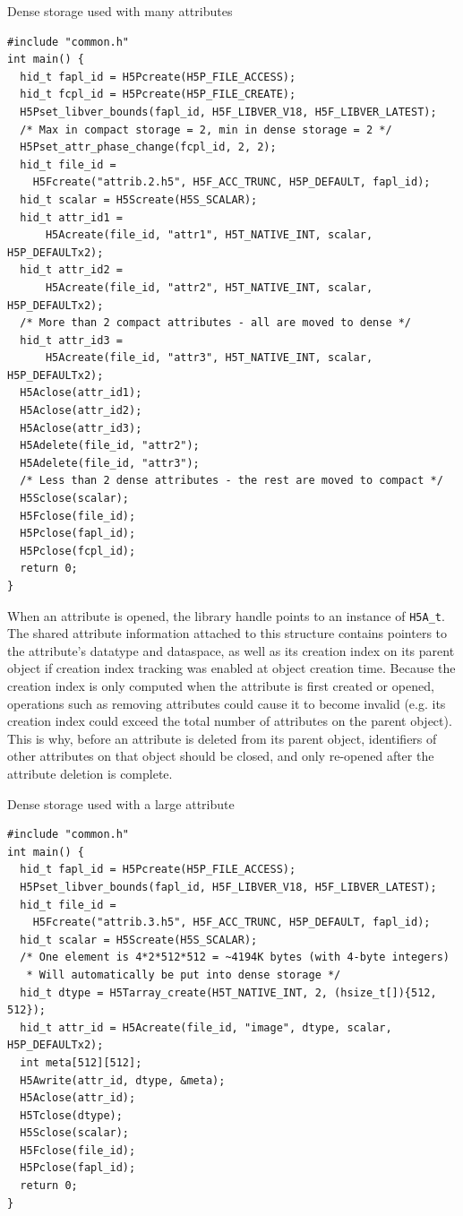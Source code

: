 \begin{listing}
\centering
\caption{Dense storage used with many attributes}
\label{lst:attribute-dense-storage-many}
\begin{verbatim}
#include "common.h"
int main() {
  hid_t fapl_id = H5Pcreate(H5P_FILE_ACCESS);
  hid_t fcpl_id = H5Pcreate(H5P_FILE_CREATE);
  H5Pset_libver_bounds(fapl_id, H5F_LIBVER_V18, H5F_LIBVER_LATEST);
  /* Max in compact storage = 2, min in dense storage = 2 */
  H5Pset_attr_phase_change(fcpl_id, 2, 2);
  hid_t file_id = 
    H5Fcreate("attrib.2.h5", H5F_ACC_TRUNC, H5P_DEFAULT, fapl_id);
  hid_t scalar = H5Screate(H5S_SCALAR);
  hid_t attr_id1 =
      H5Acreate(file_id, "attr1", H5T_NATIVE_INT, scalar, H5P_DEFAULTx2);
  hid_t attr_id2 =
      H5Acreate(file_id, "attr2", H5T_NATIVE_INT, scalar, H5P_DEFAULTx2);
  /* More than 2 compact attributes - all are moved to dense */
  hid_t attr_id3 =
      H5Acreate(file_id, "attr3", H5T_NATIVE_INT, scalar, H5P_DEFAULTx2);
  H5Aclose(attr_id1);
  H5Aclose(attr_id2);
  H5Aclose(attr_id3);
  H5Adelete(file_id, "attr2");
  H5Adelete(file_id, "attr3");
  /* Less than 2 dense attributes - the rest are moved to compact */
  H5Sclose(scalar);
  H5Fclose(file_id);
  H5Pclose(fapl_id);
  H5Pclose(fcpl_id);
  return 0;
}
\end{verbatim}
\end{listing}

When an attribute is opened, the library handle points to an instance of \texttt{H5A\_t}. The shared attribute information attached to this structure contains pointers to the attribute's datatype and dataspace, as well as its creation index on its parent object if creation index tracking was enabled at object creation time. Because the creation index is only computed when the attribute is first created or opened, operations such as removing attributes could cause it to become invalid (e.g. its creation index could exceed the total number of attributes on the parent object). This is why, before an attribute is deleted from its parent object, identifiers of other attributes on that object should be closed, and only re-opened after the attribute deletion is complete.

\begin{listing}
\centering
\caption{Dense storage used with a large attribute}
\label{lst:attribute-dense-storage-large}
\begin{verbatim}
#include "common.h"
int main() {
  hid_t fapl_id = H5Pcreate(H5P_FILE_ACCESS);
  H5Pset_libver_bounds(fapl_id, H5F_LIBVER_V18, H5F_LIBVER_LATEST);
  hid_t file_id = 
    H5Fcreate("attrib.3.h5", H5F_ACC_TRUNC, H5P_DEFAULT, fapl_id);
  hid_t scalar = H5Screate(H5S_SCALAR);
  /* One element is 4*2*512*512 = ~4194K bytes (with 4-byte integers)
   * Will automatically be put into dense storage */
  hid_t dtype = H5Tarray_create(H5T_NATIVE_INT, 2, (hsize_t[]){512, 512});
  hid_t attr_id = H5Acreate(file_id, "image", dtype, scalar, H5P_DEFAULTx2);
  int meta[512][512];
  H5Awrite(attr_id, dtype, &meta);
  H5Aclose(attr_id);
  H5Tclose(dtype);
  H5Sclose(scalar);
  H5Fclose(file_id);
  H5Pclose(fapl_id);
  return 0;
}
\end{verbatim}
\end{listing}


